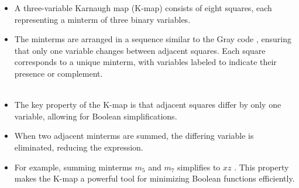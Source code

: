 \begin{itemize}
    \item A three-variable Karnaugh map (K-map) consists of eight squares, each representing a minterm of three binary variables. 
    \item The minterms are arranged in a sequence similar to the \color{blue} Gray code \color{black} , ensuring that only one variable changes between adjacent squares. Each square corresponds to a unique minterm, with variables labeled to indicate their presence or complement.\\\\
\end{itemize}

\begin{itemize}
    \item The key property of the K-map is that adjacent squares differ by only one variable, allowing for Boolean simplifications. 
    \item When two adjacent minterms are summed, the differing variable is eliminated, reducing the expression. 
    \item For example, summing minterms  $m_5$  and  $m_7$  simplifies to  $xz$ . This property makes the K-map a powerful tool for minimizing Boolean functions efficiently.
\end{itemize}

